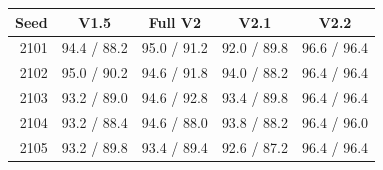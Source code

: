 \par\noindent\begin{minipage}{\columnwidth}
\label{tab:v22seeds}\centering\footnotesize
\setlength{\tabcolsep}{3pt}
\begin{tabular}{rcccc}\toprule Seed & V1.5 & Full V2 & V2.1 & V2.2\\\midrule
2101 & 94.4 / 88.2 & 95.0 / 91.2 & 92.0 / 89.8 & 96.6 / 96.4\\
2102 & 95.0 / 90.2 & 94.6 / 91.8 & 94.0 / 88.2 & 96.4 / 96.4\\
2103 & 93.2 / 89.0 & 94.6 / 92.8 & 93.4 / 89.8 & 96.4 / 96.4\\
2104 & 93.2 / 88.4 & 94.6 / 88.0 & 93.8 / 88.2 & 96.4 / 96.0\\
2105 & 93.2 / 89.8 & 93.4 / 89.4 & 92.6 / 87.2 & 96.4 / 96.4\\
\bottomrule\end{tabular}
\end{minipage}\par\medskip
